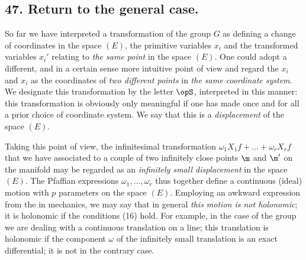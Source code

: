 \subsection*{47. Return to the general case.}


So far we have interpreted a transformation of the group $G$ as defining a change of coordinates in the space $(E)$, the primitive variables $x_i$ and the transformed variables $x_i'$ relating to \textit{the same point} in the space $(E)$. One could adopt a different, and in a certain sense more intuitive point of view and regard the $x_i$ and $x_i$ as the coordinates of \textit{two different points} in \textit{the same coordinate system}. We designate this transformation by the letter $\opS$, interpreted in this manner: this transformation is obviously only meaningful if one has made once and for all a prior choice of coordinate system. We say that this is a \textit{displacement} of the space $(E)$.

Taking this point of view, the infinitesimal transformation $\omega_1 X_1 f + \dots + \omega_r X_r f$ that we have associated to a couple of two infinitely close points $\m$ and $\m'$ on the manifold may be regarded as an \textit{infinitely small displacement} in the space $(E)$. The Pfaffian expressions $\omega_1, \dots, \omega_r$ thus together define a continuous (ideal) motion with $p$ parameters on the space $(E)$. Employing an awkward expression from the  in mechanics, we may say that in general \textit{this motion is not holonomic}; it is holonomic if the conditions (16) hold. For example, in the case of the group
we are dealing with a continuous translation on a line; this translation is holonomic if the component $\omega$ of the infinitely small translation is an exact differential; it is not in the contrary case.
